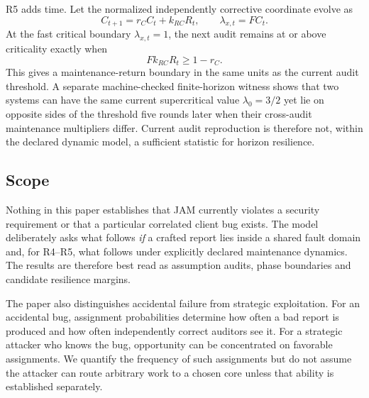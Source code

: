 R5 adds time. Let the normalized independently corrective coordinate evolve as
\[
C_{t+1}=r_C C_t+k_{RC}R_t,
\qquad
\lambda_{x,t}=F C_t.
\]
At the fast critical boundary \(\lambda_{x,t}=1\), the next audit remains at or above criticality exactly when
\[
\boxed{
F k_{RC}R_t\ge 1-r_C.
}
\]
This gives a maintenance-return boundary in the same units as the current audit threshold. A separate machine-checked finite-horizon witness shows that two systems can have the same current supercritical value \(\lambda_0=3/2\) yet lie on opposite sides of the threshold five rounds later when their cross-audit maintenance multipliers differ. Current audit reproduction is therefore not, within the declared dynamic model, a sufficient statistic for horizon resilience.

\subsection{Scope}

Nothing in this paper establishes that JAM currently violates a security requirement or that a particular correlated client bug exists. The model deliberately asks what follows \emph{if} a crafted report lies inside a shared fault domain and, for R4--R5, what follows under explicitly declared maintenance dynamics. The results are therefore best read as assumption audits, phase boundaries and candidate resilience margins.

The paper also distinguishes accidental failure from strategic exploitation. For an accidental bug, assignment probabilities determine how often a bad report is produced and how often independently correct auditors see it. For a strategic attacker who knows the bug, opportunity can be concentrated on favorable assignments. We quantify the frequency of such assignments but do not assume the attacker can route arbitrary work to a chosen core unless that ability is established separately.
